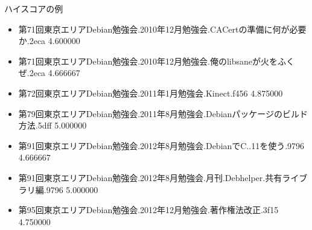 \begin{frame}{ハイスコアの例}
\begin{itemize}
  \item 
      第71回東京エリアDebian勉強会.2010年12月勉強会.CACertの準備に何が必要か.2eca 
                                                                         4.600000 
 \item 
       第71回東京エリアDebian勉強会.2010年12月勉強会.俺のlibsaneが火をふくぜ.2eca 
                                                                         4.666667 
 \item 
                         第72回東京エリアDebian勉強会.2011年1月勉強会.Kinect.f456 
                                                                         4.875000 
 \item 
   第79回東京エリアDebian勉強会.2011年8月勉強会.Debianパッケージのビルド方法.5dff 
                                                                         5.000000 
 \item 
            第91回東京エリアDebian勉強会.2012年8月勉強会.DebianでC..11を使う.9796 
                                                                         4.666667 
 \item 
第91回東京エリアDebian勉強会.2012年8月勉強会.月刊.Debhelper.共有ライブラリ編.9796 
                                                                         5.000000 
 \item 
                  第95回東京エリアDebian勉強会.2012年12月勉強会.著作権法改正.3f15 
                                                                         4.750000 

\end{itemize}
\end{frame}

